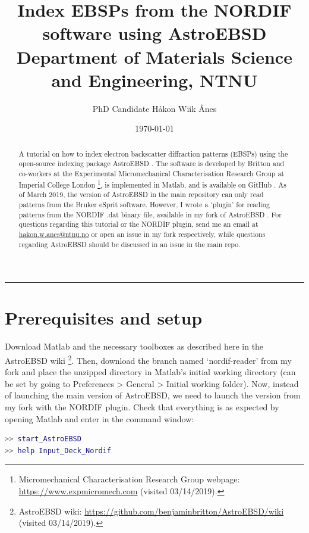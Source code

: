 \documentclass[11pt, twoside]{article}
\title{%
  \textbf{Index EBSPs from the NORDIF software using AstroEBSD}\\
  \normalsize Department of Materials Science and Engineering, NTNU}
\author{\normalsize PhD Candidate Håkon Wiik Ånes}
\date{\normalsize\today}
\begin{document}
\renewcommand{\abstractname}{Description}

\maketitle
\hrule
\thispagestyle{empty}

\begin{abstract}
\noindent A tutorial on how to index electron backscatter diffraction patterns (EBSPs) using the open-source indexing package AstroEBSD \cite{Britton2018}. The software is developed by Britton and co-workers at the Experimental Micromechanical Characterisation Research Group at Imperial College London \footnote{Micromechanical Characterisation Research Group webpage: \url{https://www.expmicromech.com} (visited 03/14/2019).}, is implemented in Matlab, and is available on GitHub \cite{astroebsd}. As of March 2019, the version of AstroEBSD in the main repository can only read patterns from the Bruker eSprit software. However, I wrote a `plugin' for reading patterns from the NORDIF .dat binary file, available in my fork of AstroEBSD \cite{astroebsd-fork}. For questions regarding this tutorial or the NORDIF plugin, send me an email at \href{mailto:hakon.w.anes@ntnu.no}{hakon.w.anes@ntnu.no} or open an issue in my fork respectively, while questions regarding AstroEBSD should be discussed in an issue in the main repo.
\end{abstract}

\tableofcontents


\section{Prerequisites and setup}

Download Matlab and the necessary toolboxes as described here in the AstroEBSD wiki \footnote{AstroEBSD wiki: \url{https://github.com/benjaminbritton/AstroEBSD/wiki} (visited 03/14/2019).}. Then, download the branch named `nordif-reader' from my fork \cite{astroebsd-fork} and place the unzipped directory in Matlab's initial working directory (can be set by going to Preferences > General > Initial working folder). Now, instead of launching the main version of AstroEBSD, we need to launch the version from my fork with the NORDIF plugin. Check that everything is as expected by opening Matlab and enter in the command window:

\begin{lstlisting}[language=matlab, numbers=none]
>> start_AstroEBSD
>> help Input_Deck_Nordif
\end{lstlisting}
\end{document}
